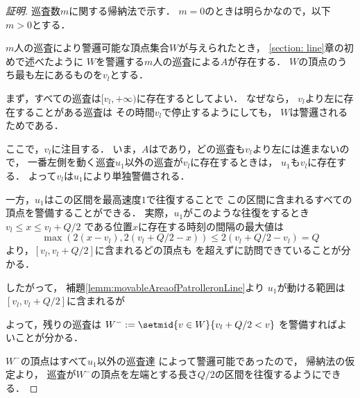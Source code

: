 \begin{proof}[証明]

	\newcommand{\leftmostpoint}{v_l}
	\newcommand{\leftmostpatroller}{u_1}

	巡査数$m$に関する帰納法で示す．
	$m = 0$のときは明らかなので，以下$m > 0$とする．

	$m$人の巡査により警邏可能な頂点集合$W$が与えられたとき，
	\ref{section: line}章の初めで述べたように
	$W$を警邏する$m$人の巡査による{\orderedrun}$A$が存在する．
	$W$の頂点のうち最も左にあるものを$\leftmostpoint$とする．

	まず，すべての巡査は$[\leftmostpoint, +\infty)$に存在するとしてよい．
	なぜなら，
	$\leftmostpoint$より左に存在することがある巡査は
	その時間$\leftmostpoint$で停止するようにしても，
	$W$は警邏されるためである．

	ここで，$\leftmostpoint$に注目する．
	いま，$A$は{\orderedrun}であり，どの巡査も$\leftmostpoint$より左には進まないので，
	一番左側を動く巡査$\leftmostpatroller$以外の巡査が$\leftmostpoint$に存在するときは，
	$\leftmostpatroller$も$\leftmostpoint$に存在する．
	よって$\leftmostpoint$は$\leftmostpatroller$により単独警備される．

	一方，$\leftmostpatroller$はこの区間を最高速度$1$で往復することで
	この区間に含まれるすべての頂点を警備することができる．
	実際，$\leftmostpatroller$がこのような往復をするとき
	$\leftmostpoint \leq x \leq \leftmostpoint + Q/2$
	である位置$x$に存在する時刻の間隔の最大値は
	\[
		\max( 2(x - \leftmostpoint), 2(\leftmostpoint + Q/2 - x) )
		\leq 2(\leftmostpoint + Q/2 - \leftmostpoint) = Q
	\]
	より，$[\leftmostpoint, \leftmostpoint + Q/2]$に含まれるどの頂点も
	{\timelimit}を超えずに訪問できていることが分かる．

	したがって，
	補題\ref{lemm:movableAreaofPatrolleronLine}より
	$\leftmostpatroller$が動ける範囲は
	$[\leftmostpoint, \leftmostpoint + Q/2]$に含まれるが
	
	よって，残りの巡査は
	$W ^- := \setmid{ v \in W }{ \leftmostpoint + Q/2 < v }$
	を警備すればよいことが分かる．

	$W ^-$の頂点はすべて$\leftmostpatroller$以外の巡査達
	によって警邏可能であったので，
	帰納法の仮定より，
	巡査が$W ^-$の頂点を左端とする長さ$Q / 2$の区間を往復するようにできる．
\end{proof}


